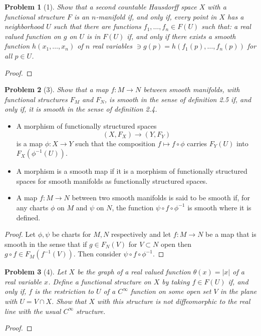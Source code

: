 \documentclass[10pt]{article}
\newcommand{\sk}{\vskip 10mm}
\theoremstyle{plain}
\newtheorem{problem}{Problem}
\theoremstyle{remark}
\begin{document}
\begin{problem}[1]
  Show that a second countable Hausdorff space $X$ with a functional
  structure $F$ is an $n$-manifold if, and only if, every point in
  $X$ has a neighborhood $U$ such that there are functions
  $f_1,\ldots,f_n\in F(U)$ such that: a real valued function on $g$
  on $U$ is in $F(U)$ if, and only if there exists a smooth function
  $h(x_1,\ldots,x_n)$ of $n$ real variables $\ni g(p)=h(f_1(p),\ldots,f_n(p))$
  for all $p\in U$.
\end{problem}

\begin{proof}
  
\end{proof}

\sk

\begin{problem}[3]
  Show that a map $f:M\rightarrow N$ between smooth manifolds, with functional
  structures $F_M$ and $F_N$, is smooth in the sense of definition 2.5
  if, and only if, it is smooth in the sense of definition 2.4.
\end{problem}

\begin{itemize}
\item[2.3:] A morphism of functionally structured spaces
  \[ (X,F_X)\rightarrow (Y,F_Y) \]
  is a map $\phi:X\rightarrow Y$ such that the composition $f\mapsto f\circ\phi$ carries
  $F_Y(U)$ into $F_X(\phi^{-1}(U))$.
\item[2.4:] A morphism is a smooth map if it is a morphism of functionally
  structured spaces for smooth manifolds as functionally structured spaces.
\item[2.5:] A map $f:M\rightarrow N$ between two smooth manifolds is said to be
  smooth if, for any charts $\phi$ on $M$ and $\psi$ on $N$, the function
  $\psi\circ f\circ\phi^{-1}$ is smooth where it is defined.
\end{itemize}

\begin{proof}
  Let $\phi,\psi$ be charts for $M,N$ respectively and let $f:M\rightarrow N$ be a map that
  is smooth in the sense that if $g\in F_N(V)$ for $V\subset N$ open then
  $g\circ f\in F_M(f^{-1}(V))$. Then consider $\psi\circ f\circ \phi^{-1}$.
\end{proof}

\sk

\begin{problem}[4]
  Let $X$ be the graph of a real valued function $\theta(x)=|x|$ of a real
  variable $x$. Define a functional structure on $X$ by taking $f\in F(U)$
  if, and only if, $f$ is the restriction to $U$ of a $C^\infty$ function on some
  open set $V$ in the plane with $U=V\cap X$. Show that $X$ with this structure
  is \textit{not} diffeomorphic to the real line with the usual $C^\infty$ structure.
\end{problem}

\begin{proof}
  
\end{proof}

\sk

\end{document}
